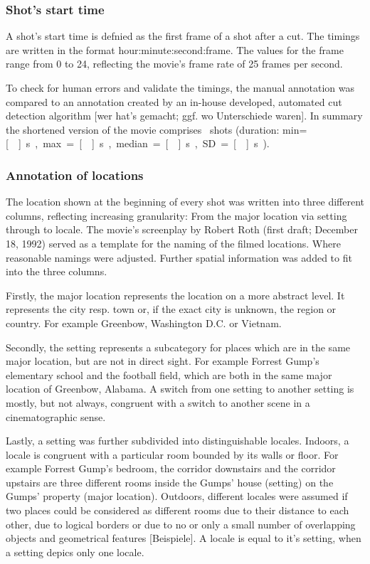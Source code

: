\documentclass[10pt,a4paper,twocolumn]{article}
\begin{document}
\subsubsection*{Shot's start time}

A shot's start time is defnied as the first frame of a shot after
a cut. The timings are written in the format hour:minute:second:frame.
The values for the frame range from 0 to 24, reflecting the movie's
frame rate of 25 frames per second. 

To check for human errors and validate the timings, the manual annotation was
compared to an annotation created by an in-house developed, automated cut
detection algorithm {[}wer hat's gemacht; ggf. wo Unterschiede waren{]}. In
summary the shortened version of the movie comprises \NShots\ shots (duration:
min=\unit[\ShotLengthMin]{s}, max=\unit[\ShotLengthMax]{s},
median=\unit[\ShotLengthMedian]{s}, SD=\unit[\ShotLengthSD]{s}).


\subsubsection*{Annotation of locations}

The location shown at the beginning of every shot was written into
three different columns, reflecting increasing granularity: From the
major location via setting through to locale. The movie's screenplay
by Robert Roth (first draft; December 18, 1992) served as a template
for the naming of the filmed locations. Where reasonable namings were
adjusted. Further spatial information was added to fit into the three
columns.

Firstly, the major location represents the location on a more abstract
level. It represents the city resp. town or, if the exact city is
unknown, the region or country. For example Greenbow, Washington D.C.
or Vietnam. 

Secondly, the setting represents a subcategory for places which are
in the same major location, but are not in direct sight. For example
Forrest Gump's elementary school and the football field, which are
both in the same major location of Greenbow, Alabama. A switch from
one setting to another setting is mostly, but not always, congruent
with a switch to another scene in a cinematographic sense.

Lastly, a setting was further subdivided into distinguishable locales.
Indoors, a locale is congruent with a particular room bounded by its
walls or floor. For example Forrest Gump's bedroom, the corridor downstairs
and the corridor upstairs are three different rooms inside the Gumps'
house (setting) on the Gumps' property (major location). Outdoors,
different locales were assumed if two places could be considered as
different rooms due to their distance to each other, due to logical
borders or due to no or only a small number of overlapping objects
and geometrical features {[}Beispiele{]}. A locale is equal to it's
setting, when a setting depics only one locale. 
\end{document}
